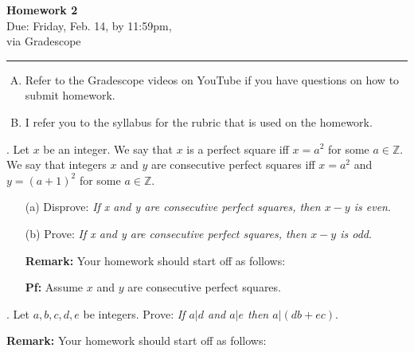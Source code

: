 \documentclass[12pt]{article}
\newif\ifshow
\begin{document}
\begin{center}
\ifshow
  \textbf{\Large Homework 0 Solution}\\
\else
  \textbf{\Large Homework 2}\\
\fi
Due: Friday, Feb. 14, by 11:59pm,\\via Gradescope\\
\end{center}

\hrule

\vspace{0.2cm}
\noindent
\begin{enumerate}[A.]
\item Refer to the Gradescope videos on YouTube if you have questions on how to submit homework.  
\item I refer you to the syllabus for the rubric that is used on the homework.  
\end{enumerate}

.  Let $x$ be an integer.  We say that $x$ is a perfect square iff $x = a^{2}$ for some $a \in \mathbb{Z}$.  We say that integers $x$ and $y$ are consecutive perfect squares iff $x= a^{2}$ and $y = (a + 1)^{2}$ for some $a \in \mathbb{Z}$.
\vspace{.05in}
\begin{enumerate}
    \item [(a)] Disprove: \textit{If x and y are consecutive perfect squares, then $x - y$ is even}.
\item[(b)] Prove: \textit{If x and y are consecutive perfect squares, then $x - y$ is odd}.

\noindent \textbf{Remark:} Your homework should start off as follows:
\vspace{.05in}

\noindent \textbf{Pf:}  Assume $x$ and $y$ are consecutive perfect squares.  
\end{enumerate}
\vspace{.05in}


.  Let $a, b, c, d, e$ be integers.  Prove: \textit{If $a | d$ and $a | e$ then $a |( db + ec)$}.
\vspace{.05in}


\noindent \textbf{Remark:} Your homework should start off as follows:
\vspace{.05in}
\end{document}
